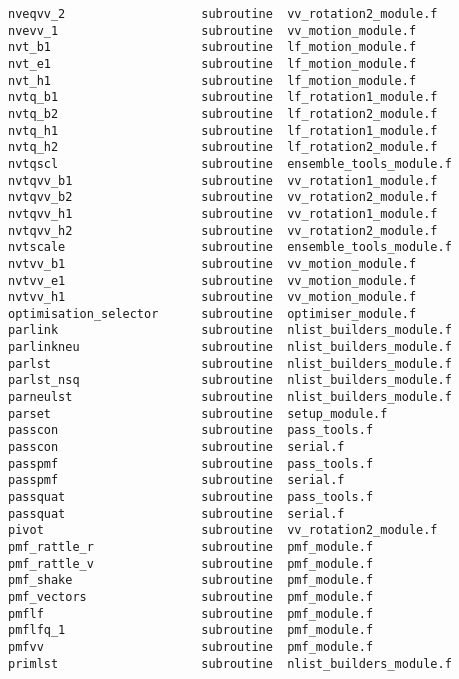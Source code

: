\begin{verbatim}
nveqvv_2                   subroutine  vv_rotation2_module.f     
nvevv_1                    subroutine  vv_motion_module.f        
nvt_b1                     subroutine  lf_motion_module.f        
nvt_e1                     subroutine  lf_motion_module.f        
nvt_h1                     subroutine  lf_motion_module.f        
nvtq_b1                    subroutine  lf_rotation1_module.f     
nvtq_b2                    subroutine  lf_rotation2_module.f     
nvtq_h1                    subroutine  lf_rotation1_module.f     
nvtq_h2                    subroutine  lf_rotation2_module.f     
nvtqscl                    subroutine  ensemble_tools_module.f   
nvtqvv_b1                  subroutine  vv_rotation1_module.f     
nvtqvv_b2                  subroutine  vv_rotation2_module.f     
nvtqvv_h1                  subroutine  vv_rotation1_module.f     
nvtqvv_h2                  subroutine  vv_rotation2_module.f     
nvtscale                   subroutine  ensemble_tools_module.f   
nvtvv_b1                   subroutine  vv_motion_module.f        
nvtvv_e1                   subroutine  vv_motion_module.f        
nvtvv_h1                   subroutine  vv_motion_module.f        
optimisation_selector      subroutine  optimiser_module.f        
parlink                    subroutine  nlist_builders_module.f   
parlinkneu                 subroutine  nlist_builders_module.f   
parlst                     subroutine  nlist_builders_module.f   
parlst_nsq                 subroutine  nlist_builders_module.f   
parneulst                  subroutine  nlist_builders_module.f   
parset                     subroutine  setup_module.f            
passcon                    subroutine  pass_tools.f              
passcon                    subroutine  serial.f                  
passpmf                    subroutine  pass_tools.f              
passpmf                    subroutine  serial.f                  
passquat                   subroutine  pass_tools.f              
passquat                   subroutine  serial.f                  
pivot                      subroutine  vv_rotation2_module.f     
pmf_rattle_r               subroutine  pmf_module.f              
pmf_rattle_v               subroutine  pmf_module.f              
pmf_shake                  subroutine  pmf_module.f              
pmf_vectors                subroutine  pmf_module.f              
pmflf                      subroutine  pmf_module.f              
pmflfq_1                   subroutine  pmf_module.f              
pmfvv                      subroutine  pmf_module.f              
primlst                    subroutine  nlist_builders_module.f   

\end{verbatim}
